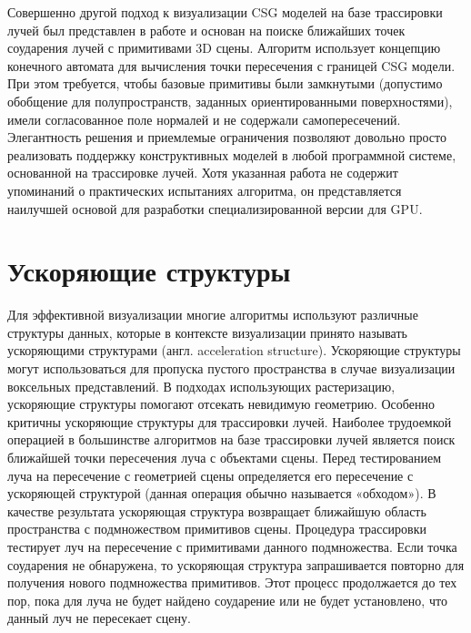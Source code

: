 {{{{{Совершенно другой подход к визуализации CSG моделей  на базе трассировки лучей был представлен в работе \todo{[8]} и основан на поиске ближайших точек соударения лучей с  примитивами 3D сцены. Алгоритм использует концепцию конечного автомата для вычисления точки пересечения с границей CSG модели. При этом требуется, чтобы базовые примитивы были замкнутыми (допустимо обобщение для полупространств, заданных ориентированными поверхностями), имели согласованное поле нормалей и не содержали самопересечений. Элегантность решения и приемлемые ограничения позволяют довольно просто реализовать поддержку конструктивных моделей в любой программной системе, основанной на трассировке лучей. Хотя указанная работа не содержит упоминаний о практических испытаниях алгоритма, он представляется наилучшей основой для разработки специализированной версии для GPU.

\section{Ускоряющие структуры} \label{sect_acceleration_structures}

Для эффективной визуализации многие алгоритмы используют различные структуры данных, которые в контексте визуализации принято называть ускоряющими структурами (англ. acceleration structure). Ускоряющие структуры могут использоваться для пропуска пустого пространства в случае визуализации воксельных представлений. В подходах использующих растеризацию, ускоряющие структуры помогают отсекать невидимую геометрию. Особенно критичны ускоряющие структуры для трассировки лучей. Наиболее трудоемкой операцией в большинстве алгоритмов на базе трассировки лучей является поиск ближайшей точки пересечения луча с объектами сцены. Перед тестированием луча на пересечение с геометрией сцены определяется его пересечение с ускоряющей структурой (данная операция обычно называется «обходом»). В качестве результата ускоряющая структура возвращает ближайшую область пространства с подмножеством примитивов сцены. Процедура трассировки тестирует луч на пересечение с примитивами данного подмножества. Если точка соударения не обнаружена, то ускоряющая структура запрашивается повторно для получения нового подмножества примитивов. Этот процесс продолжается до тех пор, пока для луча не будет найдено соударение или не будет установлено, что данный луч не пересекает сцену.

}}}}}
